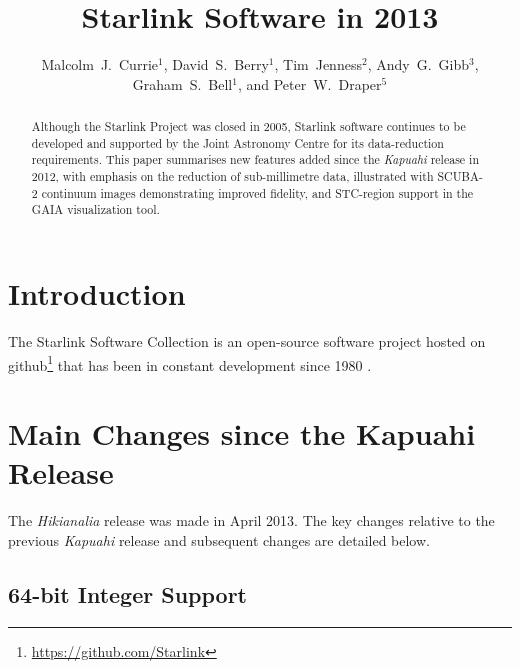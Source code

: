 \documentclass[11pt,twoside]{article}
\begin{document}
\title{Starlink Software in 2013}
\author{Malcolm~J.~Currie$^1$, David~S.~Berry$^1$, Tim~Jenness$^2$,
Andy~G.~Gibb$^3$, Graham~S.~Bell$^1$, and Peter~W.~Draper$^5$
}

\begin{abstract}
  Although the Starlink Project was closed in 2005, Starlink software
  continues to be developed and supported by the Joint Astronomy
  Centre for its data-reduction requirements. This paper summarises
  new features added since the \textit{Kapuahi} release in 2012, with
  emphasis on the reduction of sub-millimetre data, illustrated with
  SCUBA-2 continuum images demonstrating improved fidelity, and
  STC-region support in the GAIA visualization tool.
\end{abstract}

\section{Introduction}

The Starlink Software Collection is an open-source software project
hosted on github\footnote{\url{https://github.com/Starlink}} that has
been in constant development since 1980 \citep{1982QJRAS..23..485D}.

\section{Main Changes since the Kapuahi Release}

The \textit{Hikianalia} release was made in April 2013. The key
changes relative to the previous \textit{Kapuahi} release
\citep{2013ASPC..475..247B} and subsequent changes are detailed below.

\subsection*{64-bit Integer Support}
\end{document}
